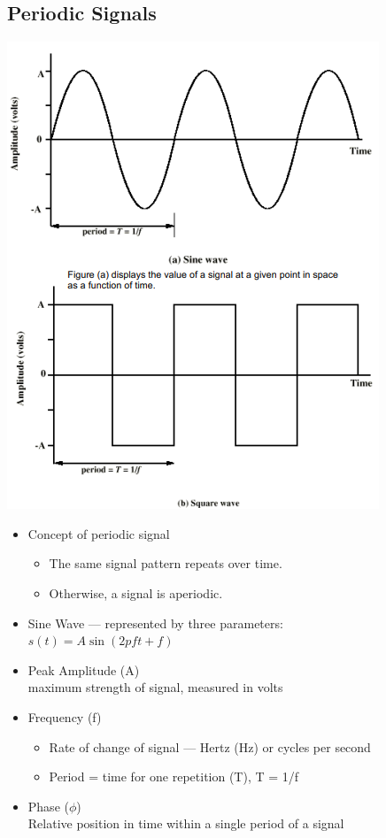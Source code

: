 \documentclass[11pt]{article}
\begin{document}
\subsection{Periodic Signals}
\includegraphics[width=\textwidth]{periodic-signals}
\begin{itemize}
    \item Concept of periodic signal
    \begin{itemize}
        \item The same signal pattern repeats over time.
        \item Otherwise, a signal is aperiodic.
    \end{itemize}
    \item Sine Wave --- represented by three parameters: \\
    \(s(t)= A \sin(2p ft+f)\)
    \item Peak Amplitude (A) \\
    maximum strength of signal, measured in volts
    \item Frequency (f) \\
    \begin{itemize}
        \item Rate of change of signal --- Hertz (Hz) or cycles per second
        \item Period = time for one repetition (T), T = 1/f
    \end{itemize}
    \item Phase (\( \phi \)) \\
    Relative position in time within a single period of a signal
\end{itemize}
\end{document}
